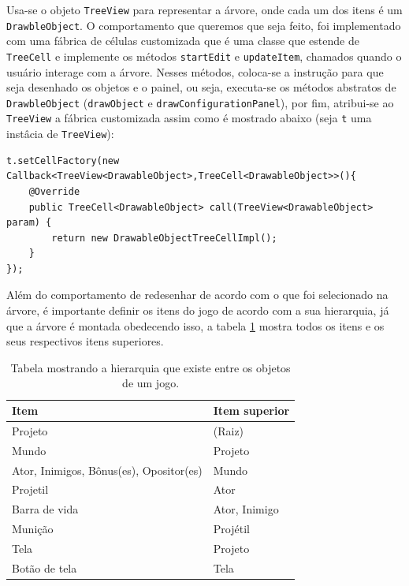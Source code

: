 \documentclass[12pt,oneside,openright,a4paper,english,brazil,sumario=tradicional]{abntex2}
\begin{document}
Usa-se o objeto \texttt{TreeView} para representar a árvore, onde cada um dos itens é um \texttt{DrawbleObject}. O comportamento que queremos que seja feito, foi implementado com uma fábrica de células customizada que é uma classe que estende de \texttt{TreeCell} e implemente os métodos \texttt{startEdit} e \texttt{updateItem}, chamados quando o usuário interage com a árvore. Nesses métodos, coloca-se a instrução para que seja desenhado os objetos e o painel, ou seja, executa-se os métodos abstratos de \texttt{DrawbleObject} (\texttt{drawObject} e \texttt{drawConfigurationPanel}),  por fim, atribui-se ao \texttt{TreeView} a fábrica customizada assim como é mostrado abaixo (seja \texttt{t} uma instâcia de \texttt{TreeView}):

\begin{lstlisting}[frame=single]
t.setCellFactory(new Callback<TreeView<DrawableObject>,TreeCell<DrawableObject>>(){
    @Override
    public TreeCell<DrawableObject> call(TreeView<DrawableObject> param) {
        return new DrawableObjectTreeCellImpl();
    }
});
\end{lstlisting}

Além do comportamento de redesenhar de acordo com o que foi selecionado na árvore, é importante definir os itens do jogo de acordo com a sua hierarquia, já que a árvore é montada obedecendo isso, a tabela \ref{table:obj-hierarquia} mostra todos os itens e os seus respectivos itens superiores.

\begin{table}[h]
   \centering
   \begin{tabular}{| p{8cm} | l | }
      \hline
      \textbf{Item} & \textbf{Item superior} \\
      \hline
      Projeto & (Raiz) \\
      Mundo & Projeto \\
      Ator, Inimigos, Bônus(es), Opositor(es) & Mundo \\
      Projetil & Ator \\
      Barra de vida & Ator, Inimigo \\
      Munição & Projétil \\
      Tela & Projeto \\
      Botão de tela & Tela \\
      \hline
   \end{tabular}
   \caption{Tabela mostrando a hierarquia que existe entre os objetos de um jogo.}
   \label{table:obj-hierarquia}
\end{table}
\end{document}
